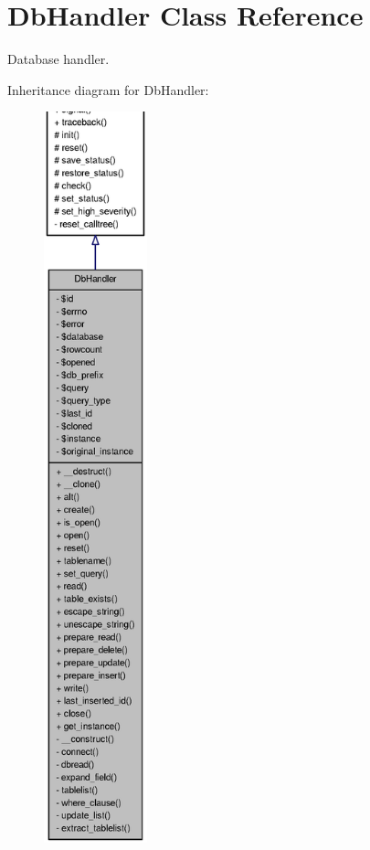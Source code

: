 \section{DbHandler Class Reference}
\label{classDbHandler}


Database handler.  




Inheritance diagram for DbHandler:
\nopagebreak
\begin{figure}[H]
\begin{center}
\leavevmode
\includegraphics[height=600pt]{classDbHandler__inherit__graph}
\end{center}
\end{figure}


